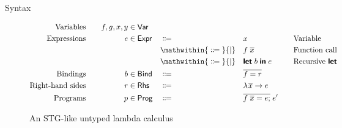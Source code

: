 \documentclass{haskellbeamer}
\newcommand{\keyword}[1]{\textsf{\textbf{#1}}}
\newcommand{\mkLetb}[2]{\keyword{let}\; #1\; \keyword{in}\; #2}
\newcommand{\ty}[1]{\textsf{#1}\xspace}
\newcommand{\var}{\ty{Var}}
\newcommand{\expr}{\ty{Expr}}
\newcommand{\bindgr}{\ty{Bind}}
\newcommand{\rhs}{\ty{Rhs}}
\newcommand{\prog}{\ty{Prog}}
\begin{document}
 
\begin{frame}[fragile]{Syntax}
  \begin{figure}[t]
  \begin{alignat*}{6}
  \text{Variables} &\quad& f,g,x,y &\in \var &&&&&\quad& \\
  \text{Expressions} && e &\in \expr && {}\Coloneqq{} && x && \text{Variable} \\
              &&&&   & \mathwithin{{}\Coloneqq{}}{\mid} && f\; \overline{x} && \text{Function call} \\
              &&&&   & \mathwithin{{}\Coloneqq{}}{\mid} && \mkLetb{b}{e} && \text{Recursive \keyword{let}} \\
  \text{Bindings} && b &\in \bindgr && {}\Coloneqq{} && \overline{f \mathrel{=} r} && \\
  \text{Right-hand sides} && r &\in \rhs && {}\Coloneqq{} && \lambda \mskip1.5mu \overline{x} \to e && \\
  \text{Programs} && p &\in \prog && {}\Coloneqq{} && \overline{f\; \overline{x} = e;}\; e' && \\
  \end{alignat*}
  \caption{An STG-like untyped lambda calculus}
  \end{figure}
\end{frame}
\end{document}
